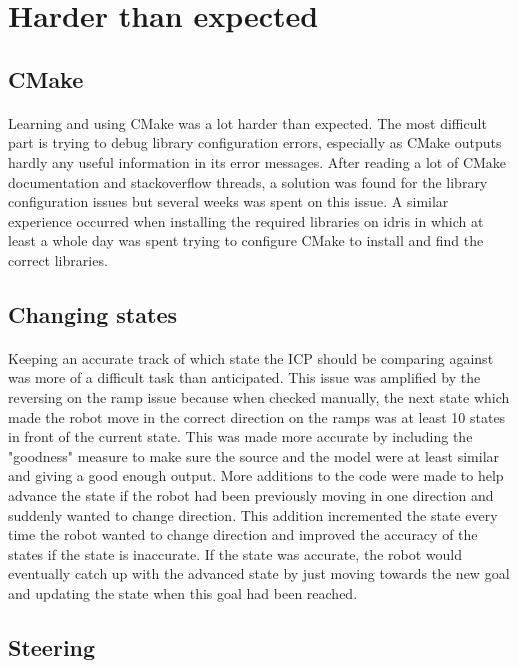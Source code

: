 \section{Harder than expected}
\subsection{CMake}
\paragraph{}
Learning and using CMake was a lot harder than expected. The most difficult part is trying to debug library configuration errors, especially as CMake outputs hardly any useful information in its error messages. After reading a lot of CMake documentation and stackoverflow threads, a solution was found for the library configuration issues but several weeks was spent on this issue. A similar experience occurred when installing the required libraries on idris in which at least a whole day was spent trying to configure CMake to install and find the correct libraries.

\subsection{Changing states}
\paragraph{}
Keeping an accurate track of which state the ICP should be comparing against was more of a difficult task than anticipated. This issue was amplified by the reversing on the ramp issue because when checked manually, the next state which made the robot move in the correct direction on the ramps was at least 10 states in front of the current state. This was made more accurate by including the "goodness" measure to make sure the source and the model were at least similar and giving a good enough output. More additions to the code were made to help advance the state if the robot had been previously moving in one direction and suddenly wanted to change direction. This addition incremented the state every time the robot wanted to change direction and improved the accuracy of the states if the state is inaccurate. If the state was accurate, the robot would eventually catch up with the advanced state by just moving towards the new goal and updating the state when this goal had been reached.

\subsection{Steering}
